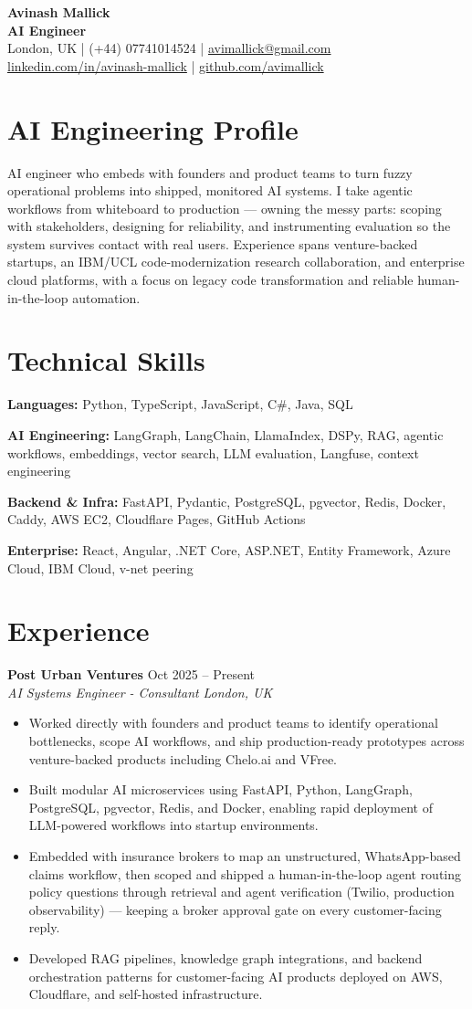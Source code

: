 \documentclass[10pt,letterpaper]{article}
\newcommand{\resumeHeader}[6]{
  \begin{center}
    {\fontsize{22}{24}\selectfont\bfseries\color{ink} #1}\\[-1pt]
    {\normalsize\bfseries\color{accent} AI Engineer}\\[4pt]
    {\small\color{muted} #2 \quad | \quad #3 \quad | \quad \href{mailto:#4}{#4}}\\[-1pt]
    {\small\color{muted} \href{#5}{linkedin.com/in/avinash-mallick} \quad | \quad \href{#6}{github.com/avimallick}}
  \end{center}
  \vspace{-4pt}
}
\newcommand{\role}[4]{
  \vspace{2pt}
  {\bfseries\color{ink} #1} \hfill {\small\color{muted} #2}\\
  {\itshape\color{muted} #3} \hfill {\small\itshape\color{muted} #4}
}
\newcommand{\summary}[1]{
  \begingroup
  \color{ink}
  \linespread{1.03}\selectfont
  #1
  \endgroup
}
\newcommand{\skillrow}[2]{
  \begingroup
  \raggedright
  {\bfseries\color{ink}#1:} #2\par\vspace{2pt}
  \endgroup
}
\begin{document}
\resumeHeader
  {Avinash Mallick}
  {London, UK}
  {(+44) 07741014524}
  {avimallick@gmail.com}
  {https://www.linkedin.com/in/avinash-mallick-b272b6214/}
  {https://github.com/avimallick}

\section*{AI Engineering Profile}
\summary{AI engineer who embeds with founders and product teams to turn fuzzy operational problems into shipped, monitored AI systems. I take agentic workflows from whiteboard to production --- owning the messy parts: scoping with stakeholders, designing for reliability, and instrumenting evaluation so the system survives contact with real users. Experience spans venture-backed startups, an IBM/UCL code-modernization research collaboration, and enterprise cloud platforms, with a focus on legacy code transformation and reliable human-in-the-loop automation.}

\section*{Technical Skills}
\skillrow{Languages}{Python, TypeScript, JavaScript, C\#, Java, SQL}
\skillrow{AI Engineering}{LangGraph, LangChain, LlamaIndex, DSPy, RAG, agentic workflows, embeddings, vector search, LLM evaluation, Langfuse, context engineering}
\skillrow{Backend \& Infra}{FastAPI, Pydantic, PostgreSQL, pgvector, Redis, Docker, Caddy, AWS EC2, Cloudflare Pages, GitHub Actions}
\skillrow{Enterprise}{React, Angular, .NET Core, ASP.NET, Entity Framework, Azure Cloud, IBM Cloud, v-net peering}

\section*{Experience}
\role{Post Urban Ventures}{Oct 2025 -- Present}{AI Systems Engineer - Consultant}{London, UK}
\begin{itemize}
  \item Worked directly with founders and product teams to identify operational bottlenecks, scope AI workflows, and ship production-ready prototypes across venture-backed products including Chelo.ai and VFree.
  \item Built modular AI microservices using FastAPI, Python, LangGraph, PostgreSQL, pgvector, Redis, and Docker, enabling rapid deployment of LLM-powered workflows into startup environments.
  \item Embedded with insurance brokers to map an unstructured, WhatsApp-based claims workflow, then scoped and shipped a human-in-the-loop agent routing policy questions through retrieval and agent verification (Twilio, production observability) --- keeping a broker approval gate on every customer-facing reply.
  \item Developed RAG pipelines, knowledge graph integrations, and backend orchestration patterns for customer-facing AI products deployed on AWS, Cloudflare, and self-hosted infrastructure.
\end{itemize}
\end{document}
